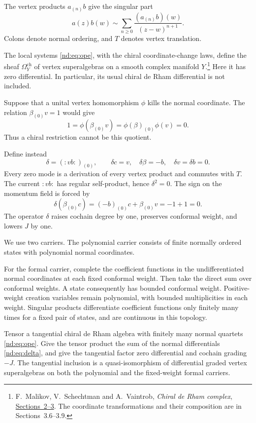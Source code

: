 The vertex products $a_{(n)}b$ give the singular part
\[
 a(z)b(w)\sim\sum_{n\geq0}
           \frac{(a_{(n)}b)(w)}{(z-w)^{n+1}}.
\]
Colons denote normal ordering, and $T$ denotes vertex translation.

The local systems \eqref{nd:eq:ope}, with the chiral coordinate-change
laws, define the sheaf $\Omega_Y^{\mathrm{ch}}$ of vertex
superalgebras on a smooth complex manifold $Y$.\footnote{
F.~Malikov, V.~Schechtman and A.~Vaintrob,
\emph{Chiral de Rham complex},
\href{https://arxiv.org/abs/math/9803041}{Sections~2--3}.
The coordinate transformations and their composition are in
Sections~3.6--3.9.}
Here it has zero differential. In particular, its usual chiral
de Rham differential is not included.

Suppose that a unital vertex homomorphism $\phi$ kills the normal
coordinate. The relation $\beta_{(0)}v=1$ would give
\[
 1=\phi(\beta_{(0)}v)=\phi(\beta)_{(0)}\phi(v)=0.
\]
Thus a chiral restriction cannot be this quotient.

Define instead
\begin{equation}\label{nd:eq:delta}
 \delta=(:vb:)_{(0)},\qquad
 \delta c=v,\quad \delta\beta=-b,\quad
 \delta v=\delta b=0.
\end{equation}
Every zero mode is a derivation of every vertex product and commutes
with $T$. The current $:vb:$ has regular self-product, hence
$\delta^2=0$. The sign on the momentum field is forced by
\[
 \delta(\beta_{(0)}c)=(-b)_{(0)}c+\beta_{(0)}v=-1+1=0.
\]
The operator $\delta$ raises cochain degree by one, preserves conformal
weight, and lowers $J$ by one.

We use two carriers. The polynomial carrier consists of finite normally
ordered states with polynomial normal coordinates.

For the formal carrier,
complete the coefficient functions in the undifferentiated normal
coordinates at each fixed conformal weight. Then take the direct sum
over conformal weights. A state consequently has bounded conformal
weight. Positive-weight creation variables remain polynomial, with
bounded multiplicities in each weight. Singular products differentiate
coefficient functions only finitely many times for a fixed pair of
states, and are continuous in this topology.

\begin{theorem}\label{nd:thm:quartet}
Tensor a tangential chiral de Rham algebra with finitely many normal
quartets \eqref{nd:eq:ope}. Give the tensor product the sum of the
normal differentials \eqref{nd:eq:delta}, and give the tangential
factor zero differential and cochain grading $-J$.
The tangential inclusion is a
quasi-isomorphism of differential graded vertex superalgebras on both
the polynomial and the fixed-weight formal carriers.
\end{theorem}

